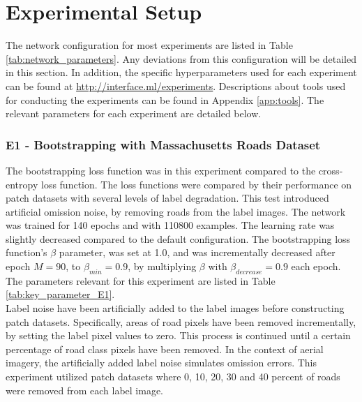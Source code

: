 \section{Experimental Setup}
\label{sec:experimentalSetup}
The network configuration for most experiments are listed in Table \ref{tab:network_parameters}. Any deviations from this configuration will be detailed in this section. In addition, the specific hyperparameters used for each experiment can be found at \url{http://interface.ml/experiments}. Descriptions about tools used for conducting the experiments can be found in Appendix \ref{app:tools}. The relevant parameters for each experiment are detailed below.\\ 

\subsubsection{E1 - Bootstrapping with Massachusetts Roads Dataset}
The bootstrapping loss function was in this experiment compared to the cross-entropy loss function. The loss functions were compared by their performance on patch datasets with several levels of label degradation. This test introduced artificial omission noise, by removing roads from the label images. The network was trained for 140 epochs and with 110800 examples. The learning rate was slightly decreased compared to the default configuration. The bootstrapping loss function's $\beta$ parameter, was set at 1.0, and was incrementally decreased after epoch $M =90$, to $\beta_{min} = 0.9$, by multiplying $\beta$ with $\beta_{decrease}=0.9$ each epoch. The parameters relevant for this experiment are listed in Table \ref{tab:key_parameter_E1}.\\

Label noise have been artificially added to the label images before constructing patch datasets. Specifically, areas of road pixels have been removed incrementally, by setting the label pixel values to zero. This process is continued until a certain percentage of road class pixels have been removed. In the context of aerial imagery, the artificially added label noise simulates omission errors. This experiment utilized patch datasets where 0, 10, 20, 30 and 40 percent of roads were removed from each label image.\\ 

